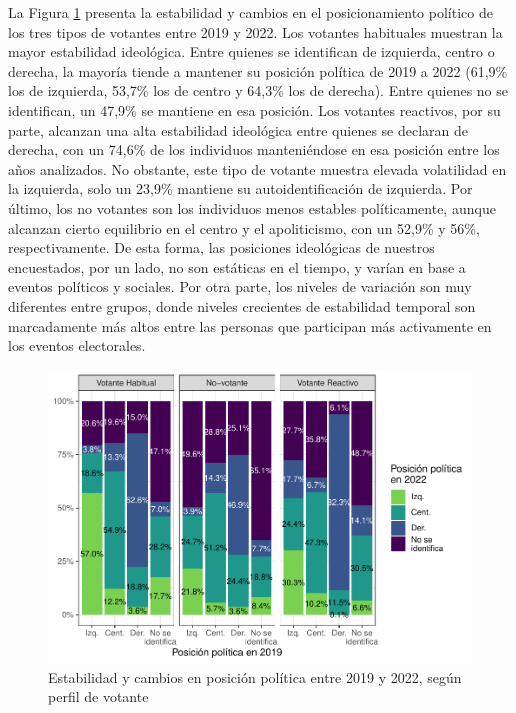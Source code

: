 \documentclass[
  12pt,
]{book}
\begin{document}
La Figura \ref{fig:graf-cambios-idpol-idpol} presenta la estabilidad y cambios en el posicionamiento político de los tres tipos de votantes entre 2019 y 2022. Los votantes habituales muestran la mayor estabilidad ideológica. Entre quienes se identifican de izquierda, centro o derecha, la mayoría tiende a mantener su posición política de 2019 a 2022 (61,9\% los de izquierda, 53,7\% los de centro y 64,3\% los de derecha). Entre quienes no se identifican, un 47,9\% se mantiene en esa posición. Los votantes reactivos, por su parte, alcanzan una alta estabilidad ideológica entre quienes se declaran de derecha, con un 74,6\% de los individuos manteniéndose en esa posición entre los años analizados. No obstante, este tipo de votante muestra elevada volatilidad en la izquierda, solo un 23,9\% mantiene su autoidentificación de izquierda. Por último, los no votantes son los individuos menos estables políticamente, aunque alcanzan cierto equilibrio en el centro y el apoliticismo, con un 52,9\% y 56\%, respectivamente. De esta forma, las posiciones ideológicas de nuestros encuestados, por un lado, no son estáticas en el tiempo, y varían en base a eventos políticos y sociales. Por otra parte, los niveles de variación son muy diferentes entre grupos, donde niveles crecientes de estabilidad temporal son marcadamente más altos entre las personas que participan más activamente en los eventos electorales.

\begin{figure}

{\centering \includegraphics{reporte-elsoc_files/figure-latex/graf-cambios-idpol-idpol-1} 

}

\caption{Estabilidad y cambios en posición política entre 2019 y 2022, según perfil de votante}\label{fig:graf-cambios-idpol-idpol}
\end{figure}
\end{document}
